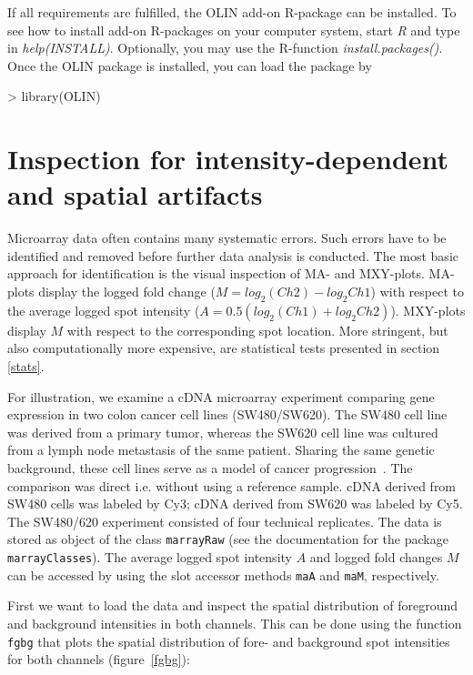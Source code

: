 \documentclass[a4paper,11pt]{article}
\begin{document}
If all requirements are fulfilled, the OLIN add-on R-package can be installed. To see how to install add-on R-packages on your computer system, start \textit{R} and type in \textit{help(INSTALL)}.
Optionally, you may use the R-function \textit{install.packages()}. 
Once the OLIN package is installed, you can load the package by 

\begin{Schunk}
\begin{Sinput}
> library(OLIN)
\end{Sinput}
\end{Schunk}



\section{Inspection for  intensity-dependent and spatial artifacts}
\label{visu}
Microarray data often contains many systematic errors.
 Such errors have to be identified and removed
 before further data analysis is conducted.  The most basic approach for identification 
 is the visual inspection 
of MA- and MXY-plots. MA-plots display the logged fold change 
($M=log_{2}(Ch2) - log_{2}{Ch1}$)
with respect to the average logged spot intensity  ($A=0.5(log_{2}(Ch1) + log_{2}{Ch2})$).
MXY-plots display $M$ with respect to the corresponding spot location. 
More stringent, but also computationally more expensive,  are statistical tests presented in section \ref{stats}. 


For illustration, we examine a cDNA microarray experiment comparing  gene expression in two colon cancer cell lines (SW480/SW620). The SW480 cell line was derived from a primary tumor, whereas 
the SW620 cell line was cultured from a lymph node metastasis of the same patient.
 Sharing the same genetic background, these cell lines serve as a  model
 of cancer progression~\cite{genomeletters}. The comparison was direct i.e. without using a 
reference sample. cDNA derived from SW480 cells was labeled by Cy3; cDNA derived 
from SW620 was labeled by Cy5. The SW480/620 experiment consisted of four 
technical replicates. The data is stored as object of the class \texttt{marrayRaw} (see
the documentation for the package \texttt{marrayClasses}). The average logged spot intensity
$A$ and logged fold changes $M$ can be accessed by using   the slot accessor methods \texttt{maA} and \texttt{maM}, respectively.


First we want to load the data and inspect the spatial distribution of foreground and
background intensities in both channels. This can be done using the  function \texttt{fgbg}
that plots the spatial distribution of fore- and background spot intensities for both channels (figure~\ref{fgbg}):
\end{document}
